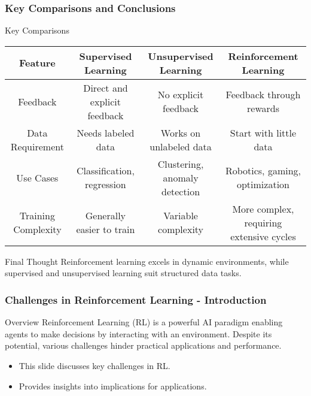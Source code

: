 \documentclass{beamer}
\begin{document}
\begin{frame}[fragile]
    \frametitle{Key Comparisons and Conclusions}
    \begin{block}{Key Comparisons}
        \begin{tabular}{|c|c|c|c|}
            \hline
            Feature                  & Supervised Learning             & Unsupervised Learning           & Reinforcement Learning        \\
            \hline
            Feedback                 & Direct and explicit feedback     & No explicit feedback             & Feedback through rewards       \\
            \hline
            Data Requirement         & Needs labeled data               & Works on unlabeled data          & Start with little data        \\
            \hline
            Use Cases                & Classification, regression       & Clustering, anomaly detection     & Robotics, gaming, optimization \\
            \hline
            Training Complexity      & Generally easier to train        & Variable complexity               & More complex, requiring extensive cycles \\
            \hline
        \end{tabular}
    \end{block}
    \begin{block}{Final Thought}
        Reinforcement learning excels in dynamic environments, while supervised and unsupervised learning suit structured data tasks.
    \end{block}
\end{frame}

\begin{frame}[fragile]
    \frametitle{Challenges in Reinforcement Learning - Introduction}
    \begin{block}{Overview}
        Reinforcement Learning (RL) is a powerful AI paradigm enabling agents to make decisions by interacting with an environment. Despite its potential, various challenges hinder practical applications and performance.
    \end{block}
    \begin{itemize}
        \item This slide discusses key challenges in RL.
        \item Provides insights into implications for applications.
    \end{itemize}
\end{frame}
\end{document}
